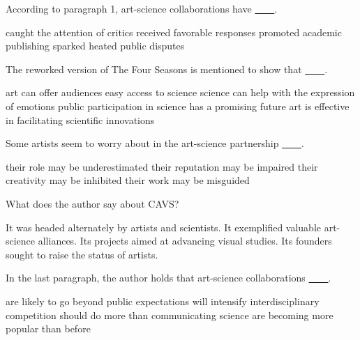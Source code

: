 \item According to paragraph 1, art-science collaborations have \uline{~~~~}.
\begin{tasks}
	\task caught the attention of critics
	\task received favorable responses
	\task promoted academic publishing
	\task sparked heated public disputes
\end{tasks}
\item The reworked version of The Four Seasons is mentioned to show that \uline{~~~~}.
\begin{tasks}
	\task art can offer audiences easy access to science
	\task science can help with the expression of emotions
	\task public participation in science has a promising future
	\task art is effective in facilitating scientific innovations
\end{tasks}
\item Some artists seem to worry about in the art-science partnership \uline{~~~~}.
\begin{tasks}
	\task their role may be underestimated
	\task their reputation may be impaired
	\task their creativity may be inhibited
	\task their work may be misguided
\end{tasks}
\item What does the author say about CAVS?
\begin{tasks}
	\task It was headed alternately by artists and scientists.
	\task It exemplified valuable art-science alliances.
	\task Its projects aimed at advancing visual studies.
	\task Its founders sought to raise the status of artists.
\end{tasks}
\item In the last paragraph, the author holds that art-science collaborations \uline{~~~~}.
\begin{tasks}
	\task are likely to go beyond public expectations
	\task will intensify interdisciplinary competition
	\task should do more than communicating science
	\task are becoming more popular than before
\end{tasks}
